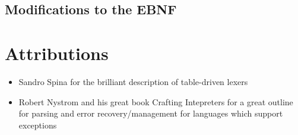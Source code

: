 \documentclass[article]{uom-coursework}
\begin{document}
\subsection{Modifications to the EBNF}




\section{Attributions}

\begin{itemize}
    \item Sandro Spina for the brilliant description of table-driven lexers
    \item Robert Nystrom and his great book Crafting Intepreters for a great
        outline for parsing and error recovery/management for languages
        which support exceptions
\end{itemize}
\end{document}
